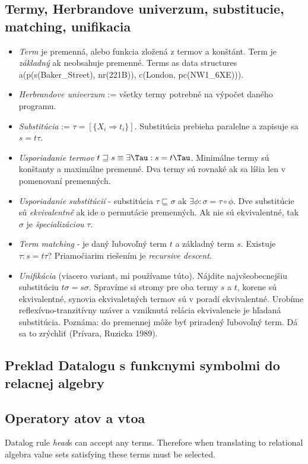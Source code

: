 \documentclass[12pt,a4paper]{article}
\begin{document}
\subsection{Termy, Herbrandove univerzum, substitucie, matching, unifikacia}
\begin{itemize} 
\item \emph{Term} je premenná, alebo funkcia zložená z termov a konštánt. Term je \emph{základný} ak neobsahuje premenné. Terms as data structures a(p(s(Baker\_Street), nr(221B)), c(London, pc(NW1\_6XE))). 
\item \emph{Herbrandove univerzum} := všetky termy potrebné na výpočet daného programu. 
\item \emph{Substitúcia} := $\tau = [\{X_i \Rightarrow t_i\}]$. Substitúcia prebieha paralelne a zapisuje sa $s = t \tau$. 
\item \emph{Usporiadanie termov} $t \sqsupseteq s \equiv \exists \Tau : s = t\Tau$. Minimálne termy sú konštanty a maximálne premenné. Dva termy sú rovnaké ak sa líšia len v pomenovaní premenných.
\item \emph{Usporiadanie substitúcií} - substitúcia $\tau \sqsubseteq \sigma$ ak $\exists \phi : \sigma = \tau \circ \phi$. Dve substitúcie sú \emph{ekvivalentné} ak ide o permutácie premenných. Ak nie sú ekvivalentné, tak $\sigma$ je \emph{špecializáciou} $\tau$. 
\item \emph{Term matching} - je daný ľubovoľný term $t$ a základný term $s$. Existuje $\tau : s = t\tau$? Priamočiarim riešením je \emph{recursive descent}. 
\item \emph{Unifikácia} (viacero variant, mi používame túto). Nájdite najvšeobecnejšiu substitúciu $t\sigma = s\sigma$. Spravíme si stromy pre oba termy $s$ a $t$, korene sú ekvivalentné, synovia ekvivaletných termov sú v poradí ekvivalentné. Urobíme reflexívno-tranzitívny uzáver a vzniknutá relácia ekvivalencie je hľadaná substitúcia. Poznáma: do premennej môže byť priradený ľubovoľný term. Dá sa to zrýchliť (Prívara, Ruzicka 1989). 
\end{itemize} 

\subsection{Preklad Datalogu s funkcnymi symbolmi do relacnej algebry}


\subsection{Operatory atov a vtoa}
Datalog rule \emph{head}s can accept any terms. Therefore when translating to relational algebra value sets satisfying these terms must be selected. 
\end{document}
